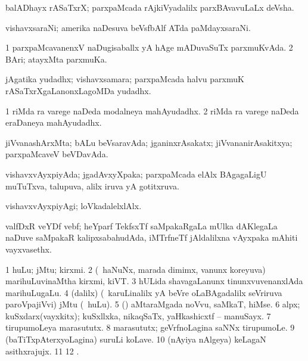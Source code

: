 {{{{{{\begin{center}
\bentry 
{} 
\gl{\nA}
\expl{}
\bmng
balADhayx rASaTxrX; parxpaMcada rAjkiVyadalilx parxBAvavuLaLx deVsha. 
\emng
\eentry

\bentry
{} 
\gl{\nA}
\expl{}
\bmng
vishavxsaraNi; amerika naDesuva beVsfbAlf ATda paMdayxsaraNi. 
\emng
\eentry

\bentry
{} 
\gl{\gu}
\expl{}
\bmng
\bnum
\num{1} parxpaMcavanenxV naDugisaballx yA hAge mADuvaSuTx parxmuKvAda. 
\num{2} BAri; atayxMta parxmuKa. 
\enum
\emng
\eentry

\bentry
{} 
\gl{\nA}
\expl{}
\bmng
{} 
\emng
\eentry

\bentry
{} 
\gl{\nA}
\expl{}
\bmng
jAgatika yudadhx; vishavxsamara; parxpaMcada halvu parxmuK rASaTxrXgaLanonxLagoMDa yudadhx. 
\emng

\noindent
\gl{\pagu}
\expl{}
\bmng
\bnum
\num{1}   riMda ra varege naDeda modalneya mahAyudadhx. 
\num{2}  riMda ra varege naDeda eraDaneya mahAyudadhx. 
\enum
\emng
\eentry

\bentry 
{} 
\gl{\gu}
\expl{}
\bmng
jiVvanashArxMta; bALu beVsaravAda; jganinxrAsakatx; jiVvananirAsakitxya; parxpaMcaveV beVDavAda. 
\emng
\eentry

\bentry
{} 
\gl{\gu}
\expl{}
\bmng
vishavxvAyxpiyAda; jgadAvxyXpaka; parxpaMcada elAlx BAgagaLigU muTuTxva, talupuva, alilx iruva yA gotitxruva. 
\emng
\eentry

\bentry
{} 
\gl{\kirxvi}
\expl{}
\bmng
vishavxvAyxpiyAgi; loVkadalelxlAlx. 
\emng
\eentry

\bentry
{} 
\gl{\nA}
\expl{}
\bmng
valfDxR veYDf vebf; heYparf TekfsxTf saMpakaRgaLa mUlka dAKlegaLa naDuve saMpakaR kalipxsabahudAda, iMTrfneTf jAldalilxna vAyxpaka mAhiti vayxvasethx. 
\emng
\eentry

\bentry
{} 
\gl{\nA}
\expl{}
\bmng
\bnum
\num{1} huLu; jMtu; kirxmi. 
\num{2} (\kanmu\ haNuNx, marada dimimx, \mo vanunx koreyuva) marihuLuvinaMtha kirxmi, kiVT. 
\num{3} hULida shavagaLanunx tinunxvuvenanxlAda marihuLugaLu. 
\num{4} (\bava dalilx) (\kanmu\ karuLinalilx yA beVre oLaBAgadalilx seVriruva paroVpajiVvi) jMtu (\mo\ huLu). 
\num{5} (\rUpa) aMtaraMgada noVvu, saMkaT, hiMse. 
\num{6} alpx; kuSxdarx(vayxkitx); kuSxllxka, nikaqSaTx, yaHkashicxtf -- manuSayx. 
\num{7} tirupumoLeya marasututx. 
\num{8} marasututx; geVrfnoLagina saNNx tirupumoLe. 
\num{9} (baTiTxpAterxyoLagina) suruLi koLave. 
\num{10} (nAyiya nAlgeya) keLagaN asithxrajujx. 
\num{11}  
\num{12} . 
\enum
\emng


\end{center}}}}}}}
